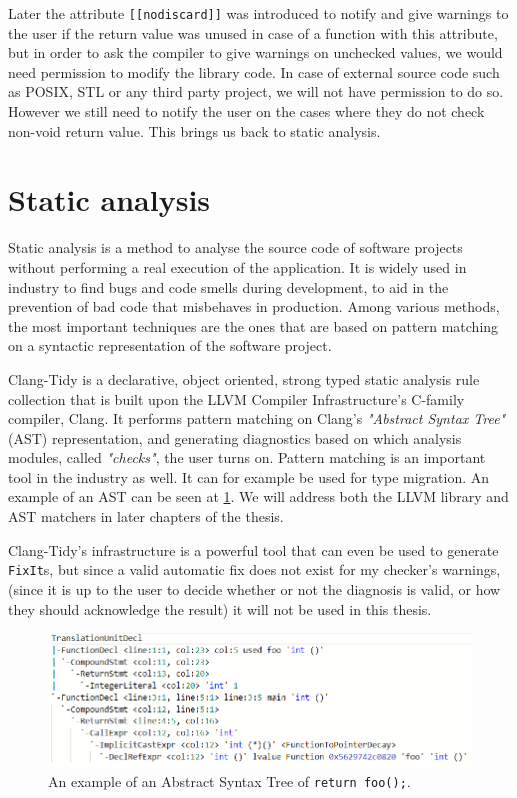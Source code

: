 Later the attribute \texttt{[[nodiscard]]} was introduced \cite{cppreferencenodiscard} to notify and give warnings to
the user if the return value was unused in case of a function
with this attribute, but in order to ask the compiler to give warnings on unchecked values, we would need permission to modify the library code.
In case of external source code such as POSIX, STL or any third party project, we will not have permission to do so.
However we still need to notify the user on the cases where they do not check non-void return value. This brings us back to static analysis.

\section{Static analysis}

Static analysis is a method to analyse the source code of software projects without performing a real execution of the application.
It is widely used in industry \cite{statcompare}
to find bugs and code smells during development, to aid in the prevention of bad code that misbehaves in
production\cite{selectiondef}.
Among various methods, the most important techniques are the ones that are based on pattern matching on a syntactic representation of
the software project.

Clang-Tidy is a declarative, object oriented, strong typed static analysis rule collection that is built upon the LLVM Compiler
Infrastructure's C-family compiler, Clang.
It performs pattern matching on Clang's \emph{"Abstract Syntax Tree"} (AST) representation, and generating diagnostics based on which
analysis modules, called \emph{"checks"}, the user turns on. Pattern matching is an important tool in the industry as well. It can for
example be used for type migration\cite{typemig}. An example of an AST can be seen at \cref{fig:ast1}.
We will address both the LLVM library and AST matchers in later chapters of the thesis.

Clang-Tidy's infrastructure is a powerful tool that can even be used to generate \lstinline{FixIt}s\cite{autorefact}, but since a
valid automatic fix does not exist for my checker's warnings, (since it is up to the user to decide whether or not the diagnosis is
valid, or how they should acknowledge the result) it will not be used in this thesis.  


\begin{figure}[H]
    \includegraphics[width=\linewidth]{images/return_foo_ast.png}
	\caption{An example of an Abstract Syntax Tree of \texttt{return foo();}.}
    \label{fig:ast1}
\end{figure}

